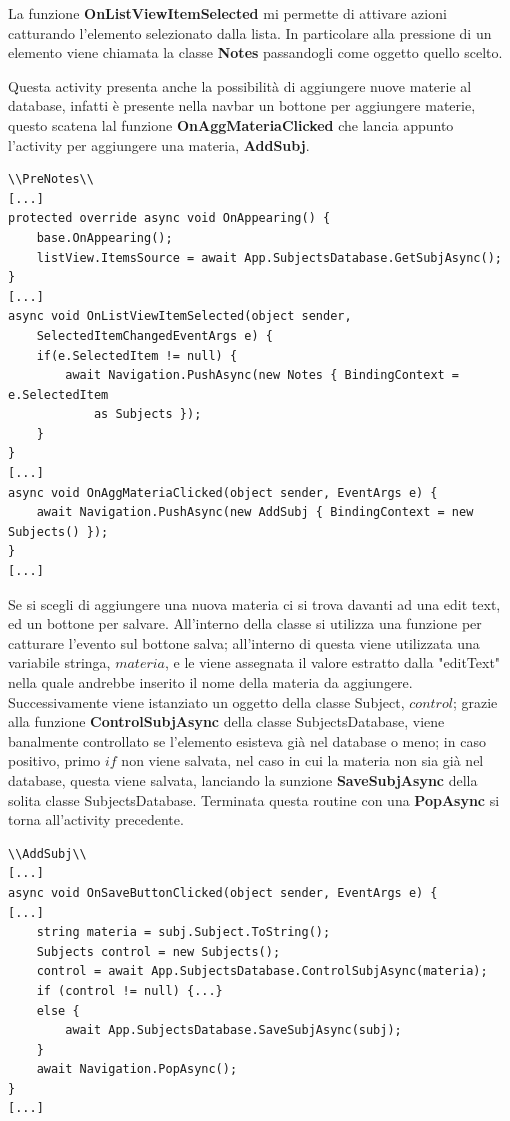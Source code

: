 \documentclass[a4paper, 50pt, twoside]{article}
\begin{document}
La funzione \textbf{OnListViewItemSelected} mi permette di attivare azioni catturando l'elemento selezionato dalla lista. In particolare alla pressione di un elemento viene chiamata la classe \textbf{Notes} passandogli come oggetto quello scelto.

Questa activity presenta anche la possibilità di aggiungere nuove materie al database, infatti è presente nella navbar un bottone per aggiungere materie, questo scatena lal funzione \textbf{OnAggMateriaClicked} che lancia appunto l'activity per aggiungere una materia, \textbf{AddSubj}.
\begin{lstlisting}
\\PreNotes\\
[...]
protected override async void OnAppearing() {
	base.OnAppearing();
	listView.ItemsSource = await App.SubjectsDatabase.GetSubjAsync();
}
[...]
async void OnListViewItemSelected(object sender, 
	SelectedItemChangedEventArgs e) {
	if(e.SelectedItem != null) {
		await Navigation.PushAsync(new Notes { BindingContext = e.SelectedItem 
			as Subjects });
	}
}
[...]
async void OnAggMateriaClicked(object sender, EventArgs e) {
	await Navigation.PushAsync(new AddSubj { BindingContext = new Subjects() });
}
[...]
\end{lstlisting}

Se si scegli di aggiungere una nuova materia ci si trova davanti ad una edit text, ed un bottone per salvare. All'interno della classe si utilizza una funzione per catturare l'evento sul bottone salva; all'interno di questa viene utilizzata una variabile stringa, $materia$, e le viene assegnata il valore estratto dalla "editText" nella quale andrebbe inserito il nome della materia da aggiungere. Successivamente viene istanziato un oggetto della classe Subject, $control$; grazie alla funzione \textbf{ControlSubjAsync} della classe SubjectsDatabase, viene banalmente controllato se l'elemento esisteva già nel database o meno; in caso positivo, primo $if$ non viene salvata, nel caso in cui la materia non sia già nel database, questa viene salvata, lanciando la sunzione \textbf{SaveSubjAsync} della solita classe SubjectsDatabase. Terminata questa routine con una \textbf{PopAsync} si torna all'activity precedente.

\begin{lstlisting}
\\AddSubj\\
[...]
async void OnSaveButtonClicked(object sender, EventArgs e) {
[...]
	string materia = subj.Subject.ToString();
	Subjects control = new Subjects();
	control = await App.SubjectsDatabase.ControlSubjAsync(materia);
	if (control != null) {...}
	else {
		await App.SubjectsDatabase.SaveSubjAsync(subj);
	}
	await Navigation.PopAsync();
}
[...]
\end{lstlisting}
\end{document}
